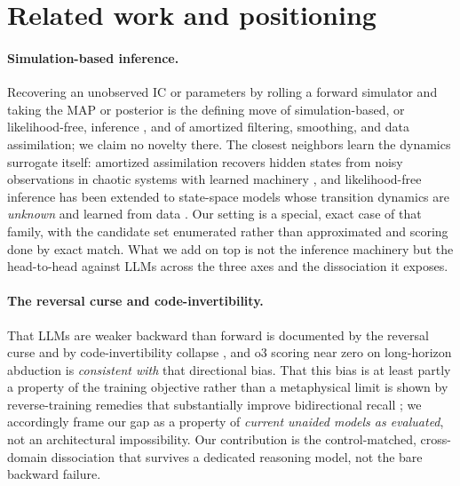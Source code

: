 \documentclass{article}
\begin{document}


\section{Related work and positioning}
\label{sec:related}

\paragraph{Simulation-based inference.}
Recovering an unobserved IC or parameters by rolling a forward simulator and taking the MAP or
posterior is the defining move of simulation-based, or likelihood-free, inference \cite{sbi2020}, and
of amortized filtering, smoothing, and data assimilation; we claim no novelty there. The closest
neighbors learn the dynamics surrogate itself: amortized assimilation recovers hidden states from
noisy observations in chaotic systems with learned machinery \cite{mccabe2021}, and likelihood-free
inference has been extended to state-space models whose transition dynamics are \emph{unknown} and
learned from data \cite{aushev2024}. Our setting is a special, exact case of that family, with the
candidate set enumerated rather than approximated and scoring done by exact match. What we add on top
is not the inference machinery but the head-to-head against LLMs across the three axes and the
dissociation it exposes.

\paragraph{The reversal curse and code-invertibility.}
That LLMs are weaker backward than forward is documented by the reversal curse \cite{reversalcurse}
and by code-invertibility collapse \cite{codeinvert}, and o3 scoring near zero on long-horizon
abduction is \emph{consistent with} that directional bias. That this bias is at least partly a
property of the training objective rather than a metaphysical limit is shown by reverse-training
remedies that substantially improve bidirectional recall \cite{reversetraining}; we accordingly frame
our gap as a property of \emph{current unaided models as evaluated}, not an architectural
impossibility. Our contribution is the control-matched, cross-domain dissociation that survives a
dedicated reasoning model, not the bare backward failure.
\end{document}
